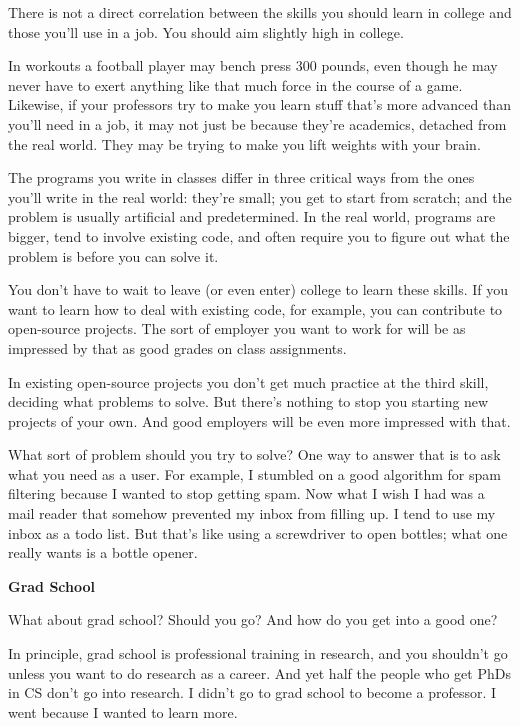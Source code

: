 There is not a direct correlation between the skills you should learn in
college and those you'll use in a job. You should aim slightly high in
college.

In workouts a football player may bench press 300 pounds, even though he
may never have to exert anything like that much force in the course of a
game. Likewise, if your professors try to make you learn stuff that's
more advanced than you'll need in a job, it may not just be because
they're academics, detached from the real world. They may be trying to
make you lift weights with your brain.

The programs you write in classes differ in three critical ways from the
ones you'll write in the real world: they're small; you get to start
from scratch; and the problem is usually artificial and predetermined.
In the real world, programs are bigger, tend to involve existing code,
and often require you to figure out what the problem is before you can
solve it.

You don't have to wait to leave (or even enter) college to learn these
skills. If you want to learn how to deal with existing code, for
example, you can contribute to open-source projects. The sort of
employer you want to work for will be as impressed by that as good
grades on class assignments.

In existing open-source projects you don't get much practice at the
third skill, deciding what problems to solve. But there's nothing to
stop you starting new projects of your own. And good employers will be
even more impressed with that.

What sort of problem should you try to solve? One way to answer that is
to ask what you need as a user. For example, I stumbled on a good
algorithm for spam filtering because I wanted to stop getting spam. Now
what I wish I had was a mail reader that somehow prevented my inbox from
filling up. I tend to use my inbox as a todo list. But that's like using
a screwdriver to open bottles; what one really wants is a bottle opener.

\textbf{Grad School}

What about grad school? Should you go? And how do you get into a good
one?

In principle, grad school is professional training in research, and you
shouldn't go unless you want to do research as a career. And yet half
the people who get PhDs in CS don't go into research. I didn't go to
grad school to become a professor. I went because I wanted to learn
more.

